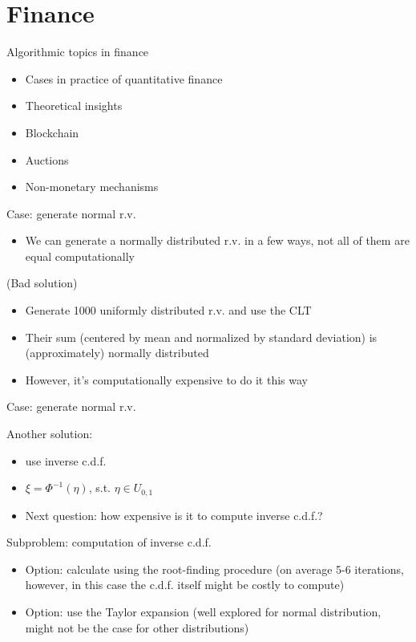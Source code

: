 \documentclass[presentation]{beamer}
\begin{document}
\section{Finance}
\label{sec-3}
\begin{frame}[label=sec-3-1]{Algorithmic topics in finance}
\begin{itemize}
\item Cases in practice of quantitative finance
\item Theoretical insights
\item Blockchain
\item Auctions
\item Non-monetary mechanisms
\end{itemize}
\end{frame}
\begin{frame}[label=sec-3-2]{Case: generate normal r.v.}
\begin{itemize}
\item We can generate a normally distributed r.v. in a few ways, not all of them are equal computationally
\end{itemize}
\begin{block}{(Bad solution)}
\begin{itemize}
\item Generate 1000 uniformly distributed r.v. and use the CLT
\item Their sum (centered by mean and normalized by standard deviation) is (approximately) normally distributed
\item However, it's computationally expensive to do it this way
\end{itemize}
\end{block}
\end{frame}
\begin{frame}[label=sec-3-3]{Case: generate normal r.v.}
\begin{block}{Another solution:}
\begin{itemize}
\item use inverse c.d.f.
\item $\xi = \Phi^{-1}(\eta)$, s.t. $\eta \in U_{0,1}$
\item Next question: how expensive is it to compute inverse c.d.f.?
\end{itemize}
\end{block}
\begin{block}{Subproblem: computation of inverse c.d.f.}
\begin{itemize}
\item Option: calculate using the root-finding procedure (on average 5-6 iterations, however, in this case the c.d.f. itself might be costly to compute)
\item Option: use the Taylor expansion (well explored for normal distribution, might not be the case for other distributions)
\end{itemize}
\end{block}
\end{frame}
\end{document}
